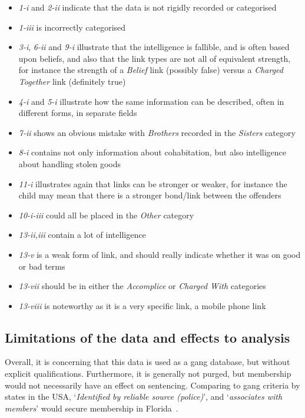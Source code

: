 \documentclass[twocolumn]{svjour3}          %
\theoremstyle{definition}
\begin{document}
\begin{itemize}
\item	\emph{1-i} and \emph{2-ii} indicate that the data is not rigidly recorded or categorised 
\item	\emph{1-iii} is incorrectly categorised
\item	\emph{3-i}, \emph{6-ii} and \emph{9-i} illustrate that the
  intelligence is fallible, and is often based upon beliefs, and also
  that the link types are not all of equivalent strength, for instance
  the strength of a \emph{Belief} link (possibly false) versus a \emph{Charged
  Together} link (definitely true)
\item	\emph{4-i} and \emph{5-i} illustrate how the same information can be described, often in different forms, in separate fields
\item	\emph{7-ii} shows an obvious mistake with \emph{Brothers} recorded in the \emph{Sisters} category
\item	\emph{8-i} contains not only information about cohabitation, but also intelligence about handling stolen goods
\item	\emph{11-i} illustrates again that links can be stronger or weaker, for instance the child may mean that there is a stronger bond/link between the offenders
\item	\emph{10-i-iii} could all be placed in the \emph{Other} category
\item	\emph{13-ii,iii} contain a lot of intelligence
\item	\emph{13-v} is a weak form of link, and should really indicate whether it was on good or bad terms
\item	\emph{13-vii} should be in either the \emph{Accomplice} or
  \emph{Charged With} categories
\item	\emph{13-viii} is noteworthy as it is a very specific link, a mobile phone link
\end{itemize}


\subsection{Limitations of the data and effects to analysis}\label{sec:limitations}

Overall, it is concerning that this
data is used as a gang database, but without explicit
qualifications. Furthermore, it is generally not purged, but
membership would not necessarily have an effect on sentencing.
Comparing to gang criteria by states in the USA, `{\emph{Identified by
reliable source (police)}}', and `{\emph{associates with members}}'
would secure membership in Florida~\citep{barrows-huff:2009}.
\end{document}
